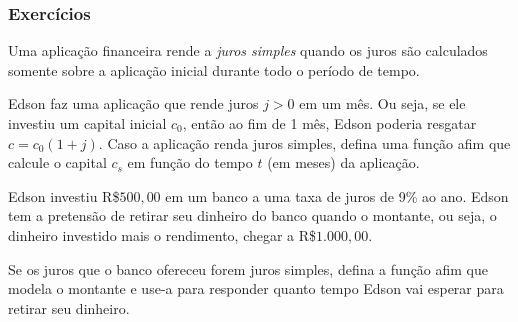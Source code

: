\begin{frame}
\frametitle{Exercícios} 

\begin{exercicio}\label{exercicio:juros-simples}
	Uma aplicação financeira rende a \emph{juros simples} quando os juros são calculados somente sobre a aplicação inicial durante todo o período de tempo.
  
	Edson faz uma aplicação que rende juros $j>0$ em um mês. Ou seja, se ele investiu um capital inicial $c_0$, então ao fim de 1 mês, Edson poderia resgatar $c = c_0(1+j)$. Caso a aplicação renda juros simples, defina uma função afim que calcule o capital $c_s$ em função do tempo $t$ (em meses) da aplicação.
  \end{exercicio}
  
\begin{exercicio}
	Edson investiu R\$$500{,}00$ em um banco a uma taxa de juros de 9\% ao ano. Edson tem a pretensão de retirar seu dinheiro do banco quando o montante, ou seja, o dinheiro investido mais o rendimento, chegar a R\$$1.000{,}00$.
  
  Se os juros que o banco ofereceu forem juros simples, defina a função afim que modela o montante e use-a para responder quanto tempo Edson vai esperar para retirar seu dinheiro.
\end{exercicio}





\end{frame}



